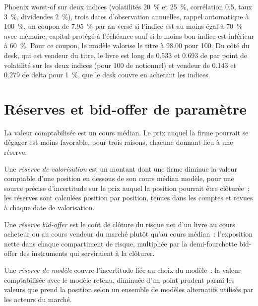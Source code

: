 \begin{example}[Le titre]\label{ex:dv:managing-an-exotic-book:note}
 Phoenix worst-of sur deux indices (volatilités 20~\% et 25~\%, corrélation 0.5, taux 3~\%, dividendes 2~\%), trois dates d'observation annuelles,
rappel automatique à 100~\%, un coupon de 7.95~\% par an versé si l'indice est au moins égal à 70~\% avec mémoire, capital protégé à l'échéance sauf si le moins bon indice est inférieur à 60~\%.
Pour ce coupon, le modèle valorise le titre à 98.00 pour 100. Du côté du desk, qui est vendeur du titre, le livre est long de 0.533 et 0.693 de  par
point de volatilité sur les deux indices (pour 100 de notionnel) et vendeur de 0.143 et 0.279 de delta pour 1~\%, que le desk couvre en achetant les indices.
\end{example}

\section{Réserves et bid-offer de paramètre}

La valeur comptabilisée est un cours médian. Le prix auquel la firme pourrait se dégager est moins favorable, pour trois raisons, chacune donnant lieu à une réserve.

\begin{definition}\label{def:dv:managing-an-exotic-book:reserve}
Une \emph{réserve de valorisation} est un montant dont une firme diminue la valeur comptable d'une position en dessous de son cours médian modèle, pour une
source précise d'incertitude sur le prix auquel la position pourrait être clôturée~; les réserves sont calculées position par position, tenues dans les comptes et revues à
chaque date de valorisation.
\end{definition}

\begin{definition}\label{def:dv:managing-an-exotic-book:bidoffer}
Une \emph{réserve bid-offer} est le coût de clôture du risque net d'un livre au cours acheteur ou au cours vendeur du marché plutôt qu'au cours médian~: l'exposition nette
dans chaque compartiment de risque, multipliée par la demi-fourchette bid-offer des instruments qui serviraient à la clôturer.
\end{definition}

\begin{definition}\label{def:dv:managing-an-exotic-book:model}
Une \emph{réserve de modèle} couvre l'incertitude liée au choix du modèle~: la valeur comptabilisée avec le modèle retenu, diminuée d'un point prudent parmi les valeurs
que prend la position selon un ensemble de modèles alternatifs utilisés par les acteurs du marché.
\end{definition}

